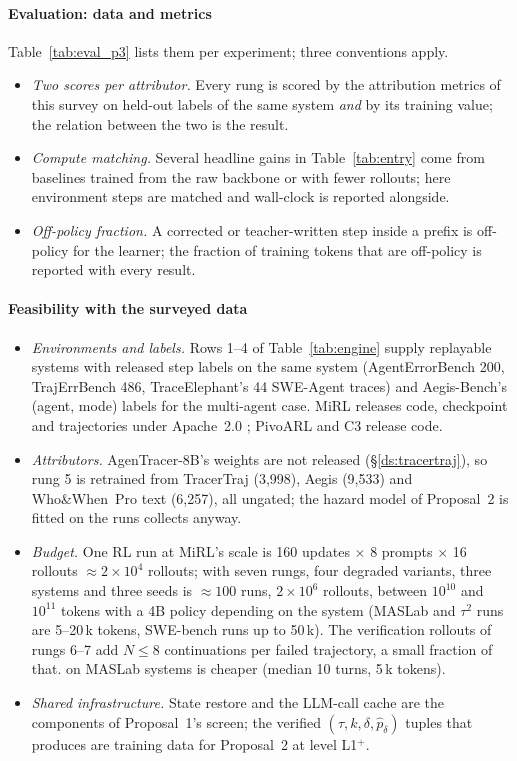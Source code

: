 \paragraph{Evaluation: data and metrics} Table~\ref{tab:eval_p3} lists them per experiment; three conventions apply.
\begin{itemize}[leftmargin=1.1em]
\item \emph{Two scores per attributor.} Every rung is scored by the attribution metrics of this survey on held-out labels of the same system \emph{and} by its training value; the relation between the two is the result.
\item \emph{Compute matching.} Several headline gains in Table~\ref{tab:entry} come from baselines trained from the raw backbone or with fewer rollouts; here environment steps are matched and wall-clock is reported alongside.
\item \emph{Off-policy fraction.} A corrected or teacher-written step inside a prefix is off-policy for the learner; the fraction of training tokens that are off-policy is reported with every result.
\end{itemize}

\paragraph{Feasibility with the surveyed data}
\begin{itemize}[leftmargin=1.1em]
\item \emph{Environments and labels.} Rows 1--4 of Table~\ref{tab:engine} supply replayable systems with released step labels on the same system (AgentErrorBench 200, TrajErrBench 486, TraceElephant's 44 SWE-Agent traces) and Aegis-Bench's (agent, mode) labels for the multi-agent case. MiRL releases code, checkpoint and trajectories under Apache~2.0 \cite{tian2026mirl}; PivoARL and C3 release code.
\item \emph{Attributors.} AgenTracer-8B's weights are not released (\S\ref{ds:tracertraj}), so rung 5 is retrained from TracerTraj (3,998), Aegis (9,533) and Who\&When~Pro text (6,257), all ungated; the hazard model of Proposal~2 is fitted on the runs  collects anyway.
\item \emph{Budget.} One RL run at MiRL's scale is 160 updates $\times$ 8 prompts $\times$ 16 rollouts $\approx 2\times10^4$ rollouts;  with seven rungs, four degraded variants, three systems and three seeds is $\approx100$ runs, $2\times10^6$ rollouts, between $10^{10}$ and $10^{11}$ tokens with a 4B policy depending on the system (MASLab and $\tau^2$ runs are 5--20\,k tokens, SWE-bench runs up to 50\,k). The verification rollouts of rungs 6--7 add $N\le8$ continuations per failed trajectory, a small fraction of that.  on MASLab systems is cheaper (median 10 turns, 5\,k tokens).
\item \emph{Shared infrastructure.} State restore and the LLM-call cache are the components of Proposal~1's screen; the verified $(\tau,k,\delta,\hat p_\delta)$ tuples that  produces are training data for Proposal~2 at level L1$^{+}$.
\end{itemize}

